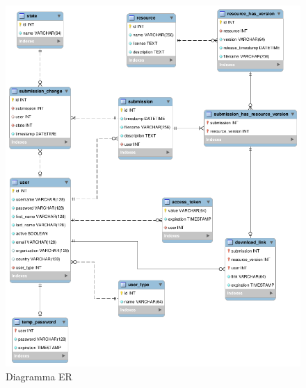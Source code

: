 \begin{figure}[ht]
	\centering
	\includegraphics[width=\textwidth]{assets/diagrams/db-er-diagram.png}
	\caption{Diagramma ER}
	\label{fig:er-diagram}
\end{figure}